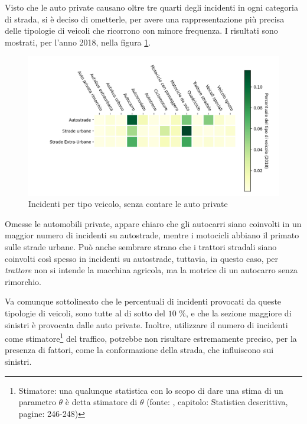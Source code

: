 \documentclass[a4paper,12pt]{report}
\newcommand{\quotestyle}[1]{\textit{#1}}
\begin{document}
Visto che le auto private causano oltre tre quarti degli 
incidenti in ogni categoria di strada,  
si è deciso di ometterle, per avere una rappresentazione più 
precisa delle tipologie di veicoli che ricorrono con minore frequenza. 
I risultati sono mostrati, per l'anno 2018, 
nella figura \ref{fig:differenza-strade-no-auto}. 

\begin{figure}
    \includegraphics[width=\linewidth]{../src/incidenti/incidenti_senza_coords/tipo_veicoli/differenza_senza_auto.png}
    \caption{Incidenti per tipo veicolo, senza contare le auto private}
    \label{fig:differenza-strade-no-auto}
\end{figure}

Omesse le automobili private, appare chiaro che gli autocarri siano coinvolti in un maggior 
numero di incidenti su autostrade, mentre i motocicli abbiano il primato sulle strade urbane. 
Può anche sembrare strano che i trattori stradali siano coinvolti così spesso in incidenti 
su autostrade, tuttavia, in questo caso, per \quotestyle{trattore} non si intende la macchina 
agricola, ma la motrice di un autocarro senza rimorchio. 

Va comunque sottolineato che le percentuali di incidenti provocati da queste tipologie di 
veicoli, sono tutte al di sotto del $10$ \%, e che la sezione maggiore di sinistri è 
provocata dalle auto private. 
Inoltre, utilizzare il numero di incidenti come 
stimatore\footnote{Stimatore: una qualunque statistica con 
lo scopo di dare una stima di un parametro $\theta$ è detta stimatore 
di $\theta$ (fonte: \cite{PROB_E_STATISTICA:1}, 
capitolo: Statistica descrittiva, pagine: 246-248)} del traffico, potrebbe non risultare 
estremamente preciso, per la presenza di fattori, come la conformazione della strada, che 
influiscono sui sinistri. 
\end{document}
